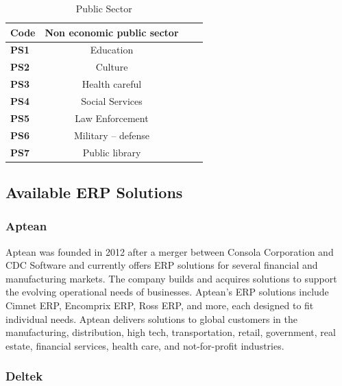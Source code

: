 \begin{table}[htb]
    \fontsize{10}{12}\selectfont
    \caption{Public Sector}
    \label{c1:tab1}
    \begin{center}
    \begin{tabular}{|p{3cm}|c|c|c|}
        \hline
        \textbf{Code }& \textbf {Non economic public sector} \\ \hline
        \textbf{PS1}    &   Education       \\\hline
        \textbf{PS2}    &   Culture         \\\hline
        \textbf{PS3}    &   Health careful  \\\hline
        \textbf{PS4}    &   Social Services \\\hline
        \textbf{PS5}    &   Law Enforcement \\\hline
        \textbf{PS6}    &   Military – defense\\\hline
        \textbf{PS7}    &   Public library   \\\hline
    \end{tabular}
    \end{center}
    \end{table}
    


\subsection{Available ERP Solutions}

\subsubsection*{Aptean}

Aptean was founded in 2012 after a merger between Consola Corporation and CDC Software and currently offers ERP solutions for several financial and manufacturing markets. The company builds and acquires solutions to support the evolving operational needs of businesses. Aptean’s ERP solutions include Cimnet ERP, Encomprix ERP, Ross ERP, and more, each designed to fit individual needs. Aptean delivers solutions to global customers in the manufacturing, distribution, high tech, transportation, retail, government, real estate, financial services, health care, and not-for-profit industries. \cite{Budget2019}


\subsubsection*{Deltek}

